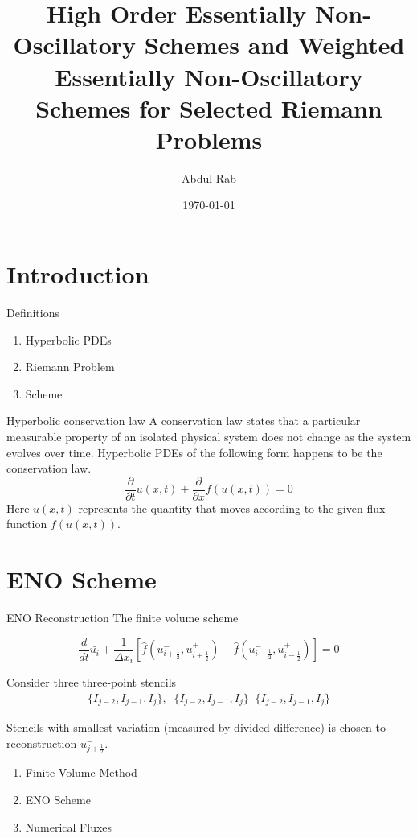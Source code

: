 \documentclass{beamer}
\title{High Order Essentially Non-Oscillatory Schemes and Weighted Essentially Non-Oscillatory Schemes for Selected Riemann Problems}
\author[Abdul Rab]{Abdul Rab\\[10mm]}
\institute{Sukkur IBA University}
\date{\today}
\begin{document}
 
\frame{\titlepage} 

\section{Introduction}

\begin{frame}{Definitions}
    \begin{enumerate}
        \item Hyperbolic PDEs
        
        \item Riemann Problem
        \item Scheme
    \end{enumerate}
\end{frame}
\begin{frame}{Hyperbolic conservation law}
A conservation law states that a particular measurable property of an isolated physical system does not change as the system evolves over time. Hyperbolic PDEs of the following form happens to be the conservation law.
\begin{equation}
    \frac{\partial }{\partial t}u(x,t) + \frac{\partial }{\partial x}f(u(x,t)) = 0
\end{equation}
Here $u(x,t)$ represents the quantity that moves according to the given flux function $f(u(x,t))$.\\

\end{frame}

\section{ENO Scheme}
\begin{frame}{ENO Reconstruction}
The finite volume scheme 

\begin{equation}
    \frac{d}{dt} \bar{u_i} + \frac{1}{\Delta x_i} \left[ \hat{f}(u^{-}_{i+\frac{1}{2}},u^{+}_{{i+\frac{1}{2}}}) - \hat{f}(u^-_{i-\frac{1}{2}} , u^+_{i-\frac{1}{2}} ) \right] = 0
\end{equation}

Consider three three-point stencils
\begin{align}
    \{ I_{j-2},I_{j-1},I_{j} \}, \; \; \{ I_{j-2},I_{j-1},I_{j} \} \; \;  \{ I_{j-2},I_{j-1},I_{j} \}
\end{align}

Stencils with smallest variation (measured by divided difference) is chosen to reconstruction $u^-_{j+\frac{1}{2}}$.


\begin{enumerate}
    \item Finite Volume Method
    \item ENO Scheme
    \item Numerical Fluxes
\end{enumerate}
\end{frame}
\end{document}
